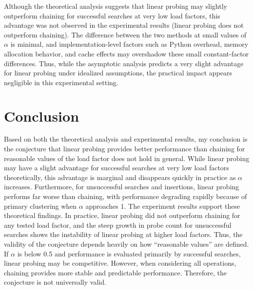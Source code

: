\documentclass[12pt, a4paper]{article}
\begin{document}
Although the theoretical analysis suggests that linear probing may slightly outperform chaining for successful searches at very low load factors, this advantage was not observed in the experimental results
(linear probing does not outperform chaining). 
The difference between the two methods at small values of $\alpha$ is minimal, and implementation-level factors such as Python overhead, memory allocation behavior, and cache effects may overshadow 
these small constant-factor differences. Thus, while the asymptotic analysis predicts a very slight advantage for linear probing under idealized assumptions, the practical impact appears negligible in this 
experimental setting.

\section*{Conclusion}
Based on both the theoretical analysis and experimental results, my conclusion is the conjecture that linear probing provides better performance than chaining for 
reasonable values of the load factor does not hold in general. 
While linear probing may have a slight advantage for successful searches at very low load factors theoretically, 
this advantage is marginal and disappears quickly in practice as $\alpha$ increases. 
Furthermore, for unsuccessful searches and insertions, linear probing performs 
far worse than chaining, with performance degrading rapidly because of primary clustering when $\alpha$ approaches 1.
The experiment results support these theoretical findings. In practice, linear probing did not outperform chaining for 
any tested load factor, and the steep growth in probe count for unsuccessful searches shows the instability of linear probing at higher load factors.
Thus, the validity of the conjecture depends heavily on how “reasonable values” are defined. If $\alpha$ is below 0.5 and 
performance is evaluated primarily by successful searches, linear probing may be competitive. However, when considering all 
operations, chaining provides more stable and predictable performance. Therefore, the conjecture is not universally valid.
\end{document}
